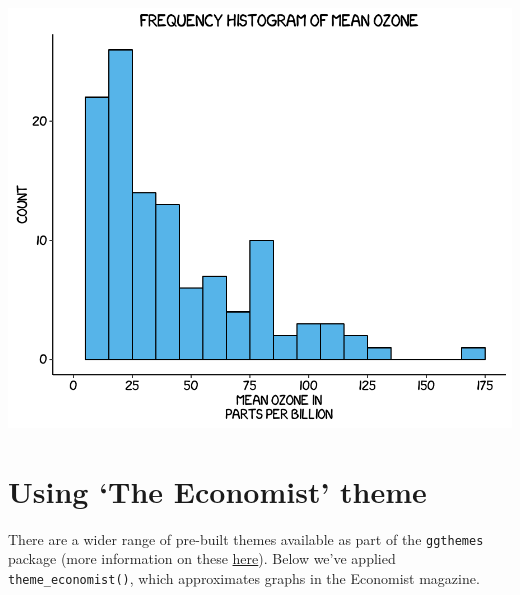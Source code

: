 \begin{Shaded}
\begin{Highlighting}[]
    \NormalTok{, }
    \NormalTok{,}
     \NormalTok{, }
     \NormalTok{(),}
     \NormalTok{(),}
     \NormalTok{(), }
     \NormalTok{(),}
     \NormalTok{(),}
    \NormalTok{(}\NormalTok{), }
    \NormalTok{(}\NormalTok{)) }
\end{Highlighting}
\end{Shaded}

\begin{center}\includegraphics[width=0.6\linewidth]{7_Histograms_pdf/histogram_14-1} \end{center}

\section{\texorpdfstring{Using `The Economist'
theme}{Using The Economist theme}}\label{using-the-economist-theme}

There are a wider range of pre-built themes available as part of the
\texttt{ggthemes} package (more information on these
\href{https://cran.r-project.org/web/packages/ggthemes/vignettes/ggthemes.html}{here}).
Below we've applied \texttt{theme\_economist()}, which approximates
graphs in the Economist magazine.

